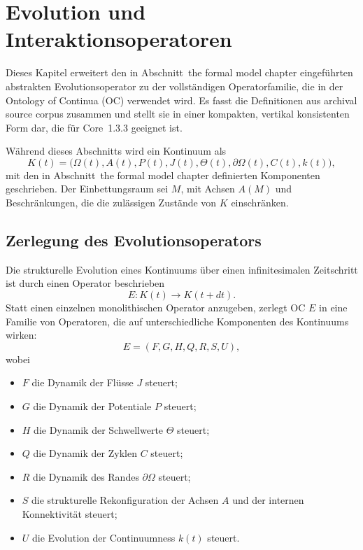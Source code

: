 
\section{Evolution und Interaktionsoperatoren}
\label{sec:operators-full}

Dieses Kapitel erweitert den in
Abschnitt~the formal model chapter eingeführten abstrakten Evolutionsoperator
zu der vollständigen Operatorfamilie, die in der Ontology of
Continua (OC) verwendet wird. Es fasst die Definitionen aus archival source corpus
zusammen und stellt sie in einer kompakten, vertikal konsistenten Form dar,
die für Core~1.3.3 geeignet ist.

Während dieses Abschnitts wird ein Kontinuum als
\[
  K(t) =
  \big(
    \Omega(t), A(t), P(t), J(t),
    \Theta(t), \partial\Omega(t), C(t), k(t)
  \big),
\]
mit den in Abschnitt~the formal model chapter definierten Komponenten geschrieben.
Der Einbettungsraum sei \(M\), mit Achsen \(A(M)\) und Beschränkungen,
die die zulässigen Zustände von \(K\) einschränken.

\subsection{Zerlegung des Evolutionsoperators}

Die strukturelle Evolution eines Kontinuums über einen infinitesimalen
Zeitschritt ist durch einen Operator beschrieben
\[
  E : K(t) \longrightarrow K(t+dt).
\]
Statt einen einzelnen monolithischen Operator anzugeben, zerlegt OC \(E\)
in eine Familie von Operatoren, die auf unterschiedliche Komponenten des
Kontinuums wirken:
\[
  E = (F, G, H, Q, R, S, U),
\]
wobei
\begin{itemize}
  \item \(F\) die Dynamik der Flüsse \(J\) steuert;
  \item \(G\) die Dynamik der Potentiale \(P\) steuert;
  \item \(H\) die Dynamik der Schwellwerte \(\Theta\) steuert;
  \item \(Q\) die Dynamik der Zyklen \(C\) steuert;
  \item \(R\) die Dynamik des Randes \(\partial\Omega\) steuert;
  \item \(S\) die strukturelle Rekonfiguration der Achsen \(A\) und
        der internen Konnektivität steuert;
  \item \(U\) die Evolution der Continuumness \(k(t)\) steuert.
\end{itemize}

